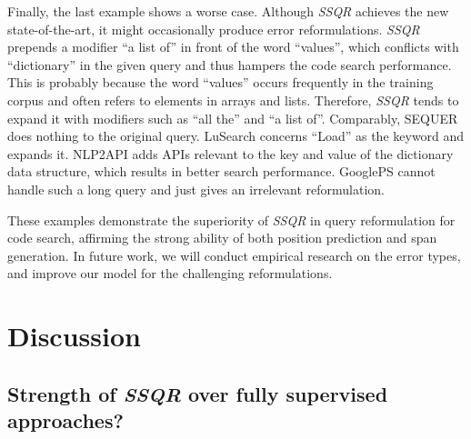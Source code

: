\documentclass[sigconf,screen]{acmart}
\newcommand{\ourmethod}{\textit{SSQR}\xspace}
\newcommand{\gu}[1]{\textcolor{blue}{[gu: #1]}}
\begin{document}


Finally, the last example shows a worse case.
Although \ourmethod achieves the new state-of-the-art, it might occasionally produce error reformulations.
\ourmethod prepends a modifier ``a list of'' in front of the word ``values'', which conflicts with ``dictionary'' in the given query and thus hampers the code search performance. This is probably because the word ``values'' occurs frequently in the training corpus and often refers to elements in arrays and lists. Therefore, \ourmethod tends to expand it with modifiers such as ``all the'' and ``a list of''. Comparably, SEQUER does nothing to the original query. LuSearch concerns ``Load'' as the keyword and expands it. NLP2API adds APIs relevant to the key and value of the dictionary data structure, which results in better search performance. GooglePS cannot handle such a long query and just gives an irrelevant reformulation.

These examples demonstrate the superiority of \ourmethod in query reformulation for code search, affirming the strong ability of both position prediction and span generation.
In future work, we will conduct empirical research on the error types, and improve our model for the challenging reformulations.



\section{Discussion}
\subsection{Strength of \ourmethod over fully supervised approaches?}
\end{document}

